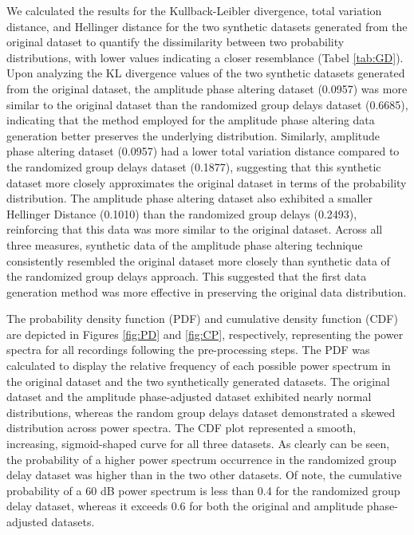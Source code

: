\documentclass{article}
\begin{document}
\par We calculated the results for the Kullback-Leibler divergence, total variation distance, and Hellinger distance for the two synthetic datasets generated from the original dataset to quantify the dissimilarity between two probability distributions, with lower values indicating a closer resemblance (Tabel \ref {tab:GD}). Upon analyzing the KL divergence values of the two synthetic datasets generated from the original dataset, the amplitude phase altering dataset (0.0957) was more similar to the original dataset than the randomized group delays dataset (0.6685), indicating that the method employed for the amplitude phase altering data generation better preserves the underlying distribution. Similarly, amplitude phase altering dataset (0.0957) had a lower total variation distance compared to the randomized group delays dataset (0.1877), suggesting that this synthetic dataset more closely approximates the original dataset in terms of the probability distribution. The amplitude phase altering dataset also exhibited a smaller Hellinger Distance (0.1010) than the randomized group delays (0.2493), reinforcing that this data was more similar to the original dataset. Across all three measures, synthetic data of the amplitude phase altering technique consistently resembled the original dataset more closely than synthetic data of the randomized group delays approach. This suggested that the first data generation method was more effective in preserving the original data distribution.

\par The probability density function (PDF) and cumulative density function (CDF) are depicted in Figures \ref{fig:PD} and \ref{fig:CP}, respectively, representing the power spectra for all recordings following the pre-processing steps. The PDF was calculated to display the relative frequency of each possible power spectrum in the original dataset and the two synthetically generated datasets. The original dataset and the amplitude phase-adjusted dataset exhibited nearly normal distributions, whereas the random group delays dataset demonstrated a skewed distribution across power spectra. The CDF plot represented a smooth, increasing, sigmoid-shaped curve for all three datasets. As clearly can be seen, the probability of a higher power spectrum occurrence in the randomized group delay dataset was higher than in the two other datasets. Of note, the cumulative probability of a 60 dB power spectrum is less than 0.4 for the randomized group delay dataset, whereas it exceeds 0.6 for both the original and amplitude phase-adjusted datasets.
\end{document}
